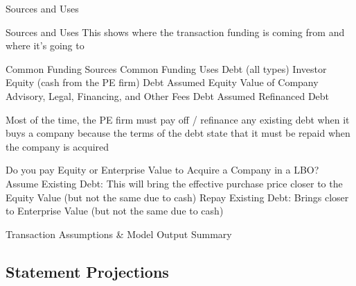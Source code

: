 \documentclass[10pt]{article}
\begin{document}
    \begin{core}{Sources and Uses}

      Sources and Uses
      This shows where the transaction funding is coming from and where it’s going to

      Common Funding Sources
      Common Funding Uses
      Debt (all types)
      Investor Equity (cash from the PE firm)
      Debt Assumed
      Equity Value of Company
      Advisory, Legal, Financing, and Other Fees
      Debt Assumed
      Refinanced Debt

      Most of the time, the PE firm must pay off / refinance any existing debt when it buys a company because the terms of the debt state that it must be repaid when the company is acquired

      Do you pay Equity or Enterprise Value to Acquire a Company in a LBO?
      Assume Existing Debt: This will bring the effective purchase price closer to the Equity Value (but not the same due to cash)
      Repay Existing Debt: Brings closer to Enterprise Value (but not the same due to cash)

      Transaction Assumptions & Model Output Summary


    \end{core}

  \subsection{Statement Projections}
\end{document}
